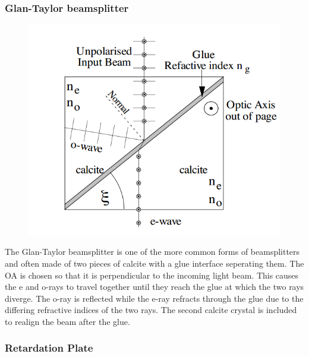 \subsubsection{Glan-Taylor beamsplitter}
\begin{minipage}{0.5\linewidth}
	\begin{figure}[H]
	\includegraphics[scale=0.7]{Photonics/beamsplitter}
	\end{figure}
\end{minipage}
\begin{minipage}{0.5\linewidth}
	The Glan-Taylor beamsplitter is one of the more common forms of beamsplitters and often made of two pieces of calcite with a glue interface seperating them.  
	The OA is chosen so that it is perpendicular to the incoming light beam. 
	This causes the e and o-rays to travel together until they reach the glue at which the two rays diverge. 
	The o-ray is reflected while the e-ray refracts through the glue due to the differing refractive indices of the two rays.
	The second calcite crystal is included to realign the beam after the glue.
\end{minipage}
\subsubsection{Retardation Plate}

 


